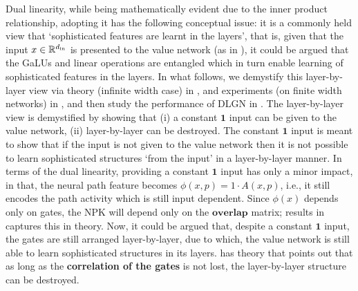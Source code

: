 Dual linearity, while being mathematically evident due to the inner product relationship, adopting it has the following conceptual issue: it is a commonly held view that `sophisticated features are learnt in the layers', that is, given that the input $x\in\mathbb{R}^{d_{\text{in}}}$  is presented to the value network (as in ), it could be argued that the GaLUs and linear operations are entangled which in turn enable learning of sophisticated features in the layers. In what follows, we demystify this layer-by-layer view via theory (infinite width case) in  , and experiments (on finite width networks) in , and then study the performance of DLGN in . The layer-by-layer view is demystified by showing that (i) a constant $\mathbf{1}$ input can be given to the value network, (ii) layer-by-layer can be destroyed. The constant $\mathbf{1}$ input is meant to show that if the input is not given to the value network then it is not possible to learn sophisticated structures `from the input' in a layer-by-layer manner.  In terms of the dual linearity, providing a constant $\mathbf{1}$ input has only a minor impact, in that, the neural path feature becomes $\phi(x,p)=1\cdot A(x,p)$, i.e., it still encodes the path activity which is still input dependent. Since $\phi(x)$ depends only on gates, the NPK will depend only on the $\textbf{overlap}$ matrix; results in   captures this in theory. Now, it could be argued that, despite a constant $\mathbf{1}$ input, the gates are still arranged layer-by-layer, due to which, the value network is still able to learn sophisticated structures in its layers.  has theory that points out that as long as the \textbf{correlation of the gates} is not lost, the layer-by-layer structure can be destroyed.
% 
